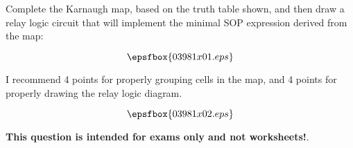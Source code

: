 

Complete the Karnaugh map, based on the truth table shown, and then draw a relay logic circuit that will implement the minimal SOP expression derived from the map:

$$\epsfbox{03981x01.eps}$$







I recommend 4 points for properly grouping cells in the map, and 4 points for properly drawing the relay logic diagram.

$$\epsfbox{03981x02.eps}$$







{\bf This question is intended for exams only and not worksheets!}.



